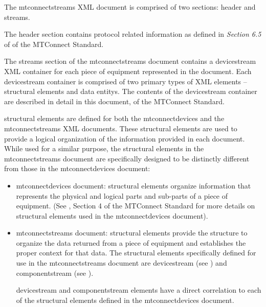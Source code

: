 The \gls{mtconnectstreams} XML document is comprised of two sections: \gls{header} and \gls{streams}.

The \gls{header} section contains protocol related information as defined in \textit{Section 6.5} of  of the MTConnect Standard.

The \gls{streams} section of the \gls{mtconnectstreams} document contains a \linebreak\gls{devicestream} XML container for each piece of equipment represented in the document.  Each \gls{devicestream} container is comprised of two primary types of XML elements – \glspl{structural element} and \glspl{data entity}.  The contents of the \gls{devicestream} container are described in detail in this document,  of the MTConnect Standard.

\glspl{structural element} are defined for both the \gls{mtconnectdevices} and the \gls{mtconnectstreams} XML documents.  These \glspl{structural element} are used to provide a logical organization of the information provided in each document.  While used for a similar purpose, the \glspl{structural element} in the \gls{mtconnectstreams} document are specifically designed to be distinctly different from those in the \gls{mtconnectdevices} document:  

\begin{itemize}

\item \gls{mtconnectdevices} document: \glspl{structural element} organize information that represents the physical and logical parts and sub-parts of a piece of equipment.  (See , Section 4 of the MTConnect Standard for more details on \glspl{structural element} used in the \gls{mtconnectdevices} document).  

\item \gls{mtconnectstreams} document: \glspl{structural element} provide the structure to organize the data returned from a piece of equipment and establishes the proper context for that data.  The \glspl{structural element} specifically defined for use in the \gls{mtconnectstreams} document are \gls{devicestream} (see ) and \gls{componentstream} (see ).   

\gls{devicestream} and \gls{componentstream} elements have a direct correlation to each of the \glspl{structural element} defined in the \gls{mtconnectdevices} document.
\end{itemize}

